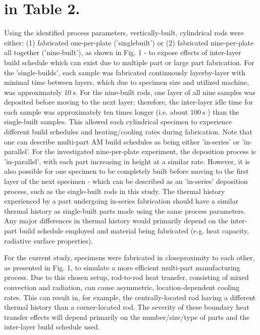 \documentclass[10pt]{article}
\begin{document}
\section*{in Table 2.}
Using the identified process parameters, vertically-built, cylindrical rods were either: (1) fabricated one-per-plate ('singlebuilt') or (2) fabricated nine-per-plate all together ('nine-built'), as shown in Fig. 1 - to expose effects of inter-layer build schedule which can exist due to multiple part or large part fabrication. For the 'single-builds', each sample was fabricated continuously layerby-layer with minimal time between layers, which due to specimen size and utilized machine, was approximately $10 \mathrm{~s}$. For the nine-built rods, one layer of all nine samples was deposited before moving to the next layer; therefore, the inter-layer idle time for each sample was approximately ten times longer (i.e. about $100 \mathrm{~s}$ ) than the single-built samples. This allowed each cylindrical specimen to experience different build schedules and heating/cooling rates during fabrication. Note that one can describe multi-part AM build schedules as being either 'in-series' or 'in-parallel'. For the investigated nine-per-plate experiment, the deposition process is 'in-parallel', with each part increasing in height at a similar rate. However, it is also possible for one specimen to be completely built before moving to the first layer of the next specimen - which can be described as an 'in-series' deposition process, such as the single-built rods in this study. The thermal history experienced by a part undergoing in-series fabrication should have a similar thermal history as single-built parts made using the same process parameters. Any major differences in thermal history would primarily depend on the inter-part build schedule employed and material being fabricated (e.g. heat capacity, radiative surface properties).

For the current study, specimens were fabricated in closeproximity to each other, as presented in Fig. 1, to simulate a more efficient multi-part manufacturing process. Due to this chosen setup, rod-to-rod heat transfer, consisting of mixed convection and radiation, can cause asymmetric, location-dependent cooling rates. This can result in, for example, the centrally-located rod having a different thermal history than a corner-located rod. The severity of these boundary heat transfer effects will depend primarily on the number/size/type of parts and the inter-layer build schedule used.
\end{document}
